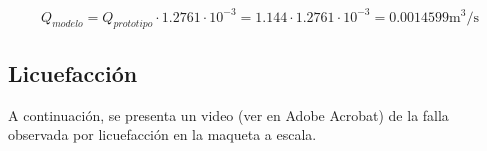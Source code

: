 \begin{equation}
    Q_{modelo} = Q_{prototipo} \cdot 1.2761 \cdot 10^{-3} = 1.144 \cdot 1.2761 \cdot 10^{-3} = 0.0014599 \text{m}^3/\text{s}
\end{equation}


\newpage
\subsection{Licuefacción}

A continuación, se presenta un video (ver en Adobe Acrobat) de la falla observada por licuefacción en la maqueta a escala.

\begin{center}

\end{center}
